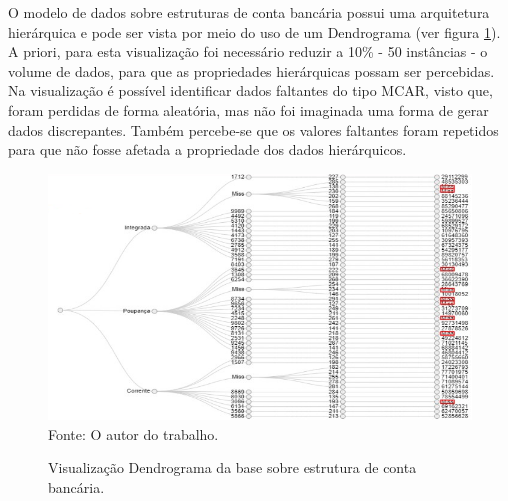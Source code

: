 \documentclass[
	12pt,				%
	openright,			%
	oneside,			%
	a4paper,			%
	english,			%
	brazil				%
	]{abntex2}
\begin{document}

	O modelo de dados sobre estruturas de conta bancária possui uma arquitetura hierárquica e pode ser vista por meio do uso de um Dendrograma (ver figura \ref{fig:BancoDendrograma}).
	A priori, para esta visualização foi necessário reduzir a 10\% - 50 instâncias - o volume de dados, para que as propriedades hierárquicas possam ser percebidas.
	Na visualização é possível identificar dados faltantes do tipo MCAR, visto que, foram perdidas de forma aleatória, mas não foi imaginada uma forma de gerar dados discrepantes.
	Também percebe-se que os valores faltantes foram repetidos para que não fosse afetada a propriedade dos dados hierárquicos.
	\par
	\begin{figure}[h!]
		\centering
		\caption{Visualização Dendrograma da base sobre estrutura de conta bancária.}
		\includegraphics[width=\linewidth]{./figures/Resultados/BancoDendrograma.png}
		\label{fig:BancoDendrograma}
		\footnotesize Fonte: O autor do trabalho.
	\end{figure}

\end{document}
